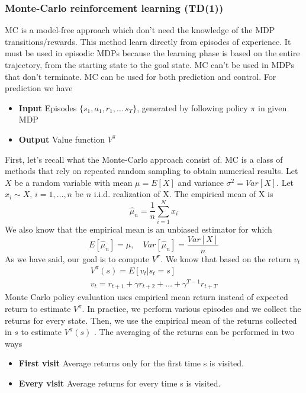 \documentclass[main.tex]{subfiles}
\begin{document}
\subsubsection{Monte-Carlo reinforcement learning (TD(1))}
MC is a model-free approach which don't need the knowledge of the MDP transitions/rewards. This method learn directly from episodes of experience. It must be used in episodic MDPs\footnotemark {} because the learning phase is based on the entire trajectory\footnotemark, from the starting state to the goal state. MC can't be used in MDPs that don't terminate.
MC can be used for both prediction and control. For prediction we have
\begin{itemize}
    \item \textbf{Input} Episodes $\{ s_1,a_1,r_1,\dots\,s_T \}$, generated by following policy $\pi$ in given MDP
    \item \textbf{Output} Value function $V^{\pi}$
\end{itemize}
First, let's recall what the Monte-Carlo approach consist of. MC is a class of methods that rely on repeated random sampling to obtain numerical results. Let $X$ be a random variable with mean $\mu = E[X]$ and variance $\sigma^2 = Var[X]$. Let $x_i \sim X$, $i=1,\dots,n$ be $n$ i.i.d. realization of X.
\newline
The empirical mean of X is
\begin{equation*}
    \hat{\mu}_n = \frac{1}{n} \sum_{i=1}^N x_i
\end{equation*}
We also know that the empirical mean is an unbiased estimator for which
\begin{equation*}
    E[\hat{\mu}_n] = \mu, \quad Var[\hat{\mu}_n] = \frac{Var[X]}{n}
\end{equation*}
\newline
As we have said, our goal is to compute $V^{\pi}$. We know that based on the return $v_t$
\begin{align*}
    V^{\pi}(s) = E[v_t|s_t=s] \\
    v_t = r_{t+1} + \gamma r_{t+2} + \dots + \gamma^{T-1} r_{t+T}
\end{align*}
Monte Carlo policy evaluation uses empirical mean return instead of
expected return to estimate $V^{\pi}$. In practice, we perform various episodes and we collect the returns for every state. Then, we use the empirical mean of the returns collected in $s$ to estimate $V^{\pi}(s)$ .
The averaging of the returns can be performed in two ways
\begin{itemize}
    \item \textbf{First visit} Average returns only for the first time s is visited.
    \item \textbf{Every visit} Average returns for every time s is visited.
\end{itemize}
\end{document}

